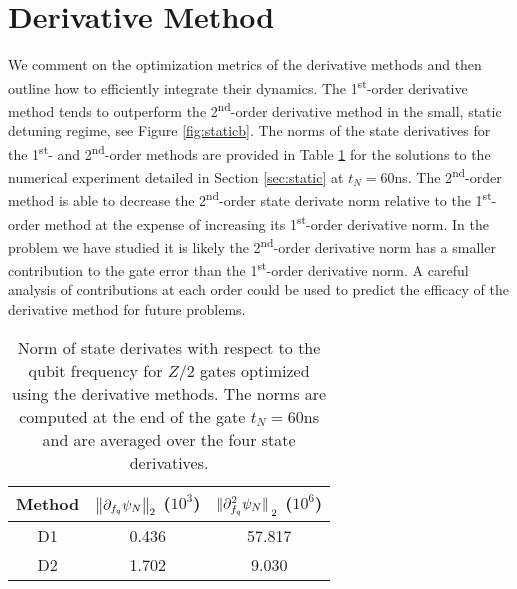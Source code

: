 \section{Derivative Method \label{appendix:derivative}}
We comment on the optimization metrics of the derivative methods and then
outline how to efficiently integrate their dynamics.
The 1\textsuperscript{st}-order derivative method tends
to outperform the 2\textsuperscript{nd}-order
derivative method in the small, static detuning regime, see Figure \ref{fig:staticb}.
The norms of the state derivatives for the 1\textsuperscript{st}- and 2\textsuperscript{nd}-order
methods are provided in Table \ref{tab:dnorm} for the solutions to
the numerical experiment detailed in Section \ref{sec:static} at $t_{N} = 60$ns.
The 2\textsuperscript{nd}-order method is able to decrease the 2\textsuperscript{nd}-order
state derivate norm relative to the 1\textsuperscript{st}-order method at the expense of increasing
its 1\textsuperscript{st}-order derivative norm. In the problem
we have studied it is likely the 2\textsuperscript{nd}-order derivative norm has a smaller
contribution to the gate error than the 1\textsuperscript{st}-order derivative norm. A
careful analysis of contributions at each order could be used to predict the efficacy of the
derivative method for future problems.

\begin{table}[ht]
  \begin{tabular}{c | c | c}
    Method & $\norm{\partial_{f_{q}} \psi_{N}}_{2}$ ($10^{3}$)
    & $\norm*{\partial^{2}_{f_{q}} \psi_{N}}_{2}$ ($10^{6}$)\\
    \hline
    D1 & 0.436 & 57.817\\
    D2 & 1.702 & 9.030\\
  \end{tabular}
  \caption{Norm of state derivates with respect to the qubit frequency
    for $Z/2$ gates optimized using the derivative methods. The norms are computed
    at the end of the gate $t_{N} = 60$ns
    and are averaged over the four state derivatives.}
  \label{tab:dnorm}
\end{table}

